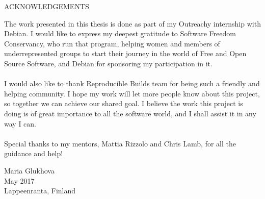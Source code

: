 {\centering
%
\SuperFont\MakeTextUppercase{Acknowledgements}\\
}

The work presented in this thesis is done as part of my Outreachy internship
with Debian. I would like to express my deepest gratitude to Software Freedom
Conservancy, who run that program, helping women and members of
underrepresented groups to start their journey in the world of Free and Open
Source Software, and Debian for sponsoring my participation in it.\\\\
I would also like to thank Reproducible Builds team for being such a
friendly and helping community. I hope my work will let more people
know about this project, so together we can achieve our shared goal.
I believe the work this project is doing is of great importance to all
the software world, and I shall assist it in any way I can.\\\\
Special thanks to my mentors, Mattia Rizzolo and Chris Lamb, for all the guidance and help!

Maria Glukhova\\
May 2017\\
Lappeenranta, Finland\\
